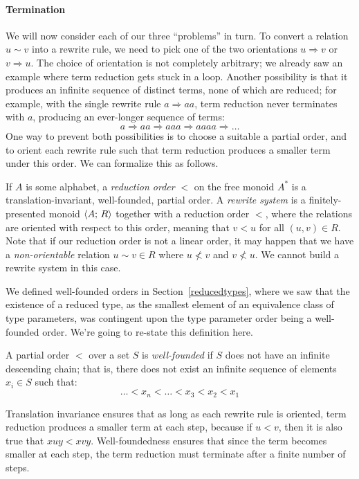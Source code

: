 \documentclass[../generics]{subfiles}
\begin{document}
\paragraph{Termination}  We will now consider each of our three ``problems'' in turn. To convert a relation $u\sim v$ into a rewrite rule, we need to pick one of the two orientations $u\Rightarrow v$ or $v\Rightarrow u$. The choice of orientation is not completely arbitrary; we already saw an example where term reduction gets stuck in a loop. Another possibility is that it produces an infinite sequence of distinct terms, none of which are reduced; for example, with the single rewrite rule $a\Rightarrow aa$, term reduction never terminates with $a$, producing an ever-longer sequence of terms:
\[a\Rightarrow aa\Rightarrow aaa\Rightarrow aaaa\Rightarrow\ldots\]
One way to prevent both possibilities is to choose a suitable a partial order, and to orient each rewrite rule such that term reduction produces a smaller term under this order. We can formalize this as follows.
\begin{definition}\label{reduction order def}
If $A$ is some alphabet, a \emph{reduction order} $<$ on the free monoid $A^*$ is a translation-invariant, well-founded, partial order. A \emph{rewrite system} is a finitely-presented monoid $\langle A;\,R\rangle$ together with a reduction order $<$, where the relations are oriented with respect to this order, meaning that $v<u$ for all $(u,v)\in R$. Note that if our reduction order is not a linear order, it may happen that we have a \emph{non-orientable} relation $u\sim v\in R$ where $u\not< v$ and $v\not< u$. We cannot build a rewrite system in this case.
\end{definition}
We defined well-founded orders in Section~\ref{reducedtypes}, where we saw that the existence of a reduced type, as the smallest element of an equivalence class of type parameters, was contingent upon the type parameter order being a well-founded order. We're going to re-state this definition here.
\begin{definition}
A partial order $<$ over a set $S$ is \emph{well-founded} if $S$ does not have an infinite descending chain; that is, there does not exist an infinite sequence of elements $x_i\in S$ such that:
\[\ldots <x_n<\ldots <x_3<x_2<x_1\]
\end{definition}
Translation invariance ensures that as long as each rewrite rule is oriented, term reduction produces a smaller term at each step, because if $u<v$, then it is also true that $xuy<xvy$. Well-foundedness ensures that since the term becomes smaller at each step, the term reduction must terminate after a finite number of steps.
\end{document}
